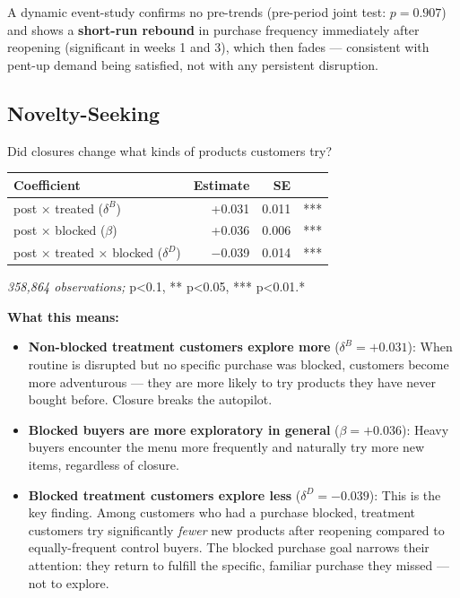 \documentclass[
  letterpaper,
  DIV=11,
  numbers=noendperiod]{scrartcl}
\newcounter{none} %
\providecommand{\tightlist}{%
  \setlength{\itemsep}{0pt}\setlength{\parskip}{0pt}}
\begin{document}
A dynamic event-study confirms no pre-trends (pre-period joint test:
\(p = 0.907\)) and shows a \textbf{short-run rebound} in purchase
frequency immediately after reopening (significant in weeks 1 and 3),
which then fades --- consistent with pent-up demand being satisfied, not
with any persistent disruption.

\subsection{Novelty-Seeking}\label{novelty-seeking}

Did closures change what kinds of products customers try?

{\def\LTcaptype{none} %
\begin{longtable}[]{@{}lrrl@{}}
\toprule\noalign{}
Coefficient & Estimate & SE & \\
\midrule\noalign{}
\endhead
\bottomrule\noalign{}
\endlastfoot
post × treated (\(\delta^B\)) & +0.031 & 0.011 & *** \\
post × blocked (\(\beta\)) & +0.036 & 0.006 & *** \\
post × treated × blocked (\(\delta^D\)) & −0.039 & 0.014 & *** \\
\end{longtable}
}

\emph{358,864 observations; } p\textless0.1, ** p\textless0.05, ***
p\textless0.01.*

\textbf{What this means:}

\begin{itemize}
\tightlist
\item
  \textbf{Non-blocked treatment customers explore more}
  (\(\delta^B = +0.031\)): When routine is disrupted but no specific
  purchase was blocked, customers become more adventurous --- they are
  more likely to try products they have never bought before. Closure
  breaks the autopilot.
\item
  \textbf{Blocked buyers are more exploratory in general}
  (\(\beta = +0.036\)): Heavy buyers encounter the menu more frequently
  and naturally try more new items, regardless of closure.
\item
  \textbf{Blocked treatment customers explore less}
  (\(\delta^D = -0.039\)): This is the key finding. Among customers who
  had a purchase blocked, treatment customers try significantly
  \emph{fewer} new products after reopening compared to equally-frequent
  control buyers. The blocked purchase goal narrows their attention:
  they return to fulfill the specific, familiar purchase they missed ---
  not to explore.
\end{itemize}
\end{document}
